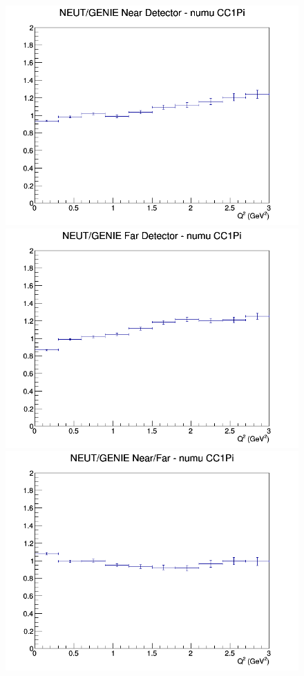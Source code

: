 \begin{figure}[h]
\endminipage
\newline
{}
\includegraphics[width=\linewidth]{eff_Q2/FGT/ratios/CC1Pi_NEUT_GENIE_numu_near_Q2.png}
\endminipage
{}
\includegraphics[width=\linewidth]{eff_Q2/FGT/ratios/CC1Pi_NEUT_GENIE_numu_far_Q2.png}
\endminipage
{}
\includegraphics[width=\linewidth]{eff_Q2/FGT/ratios/CC1Pi_NEUT_GENIE_numu_NF_Q2.png}

\end{figure}
